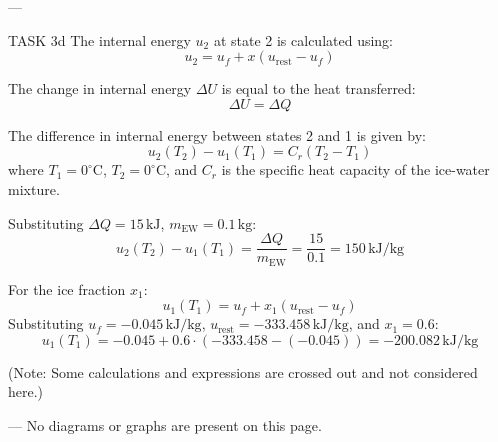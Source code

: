 ---

TASK 3d  
The internal energy \( u_2 \) at state 2 is calculated using:  
\[
u_2 = u_f + x (u_{\text{rest}} - u_f)
\]  

The change in internal energy \( \Delta U \) is equal to the heat transferred:  
\[
\Delta U = \Delta Q
\]  

The difference in internal energy between states 2 and 1 is given by:  
\[
u_2(T_2) - u_1(T_1) = C_r (T_2 - T_1)
\]  
where \( T_1 = 0^\circ\text{C} \), \( T_2 = 0^\circ\text{C} \), and \( C_r \) is the specific heat capacity of the ice-water mixture.  

Substituting \( \Delta Q = 15 \, \text{kJ} \), \( m_{\text{EW}} = 0.1 \, \text{kg} \):  
\[
u_2(T_2) - u_1(T_1) = \frac{\Delta Q}{m_{\text{EW}}} = \frac{15}{0.1} = 150 \, \text{kJ/kg}
\]  

For the ice fraction \( x_1 \):  
\[
u_1(T_1) = u_f + x_1 (u_{\text{rest}} - u_f)
\]  
Substituting \( u_f = -0.045 \, \text{kJ/kg} \), \( u_{\text{rest}} = -333.458 \, \text{kJ/kg} \), and \( x_1 = 0.6 \):  
\[
u_1(T_1) = -0.045 + 0.6 \cdot (-333.458 - (-0.045)) = -200.082 \, \text{kJ/kg}
\]  

(Note: Some calculations and expressions are crossed out and not considered here.)  

---  
No diagrams or graphs are present on this page.